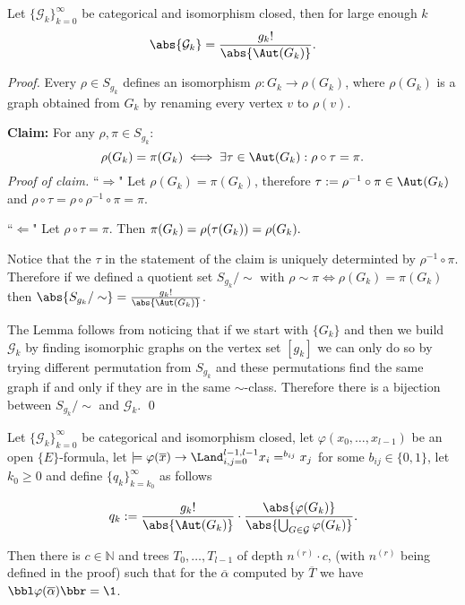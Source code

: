 \begin{lemm}
Let $\{\mathcal{G}_k\}_{k=0}^\infty$ be categorical and isomorphism closed, then for large enough $k$
\[\abs{\mathcal{G}_k}=\frac{g_k!}{\abs{\Aut(G_k)}}.\]
\end{lemm}
\begin{proof}
Every $\rho\in S_{g_k}$ defines an isomorphism $\rho:G_k\to\rho(G_k)$, where $\rho(G_k)$ is a graph obtained from $G_k$ by renaming every vertex $v$ to $\rho(v)$.

\textbf{Claim:} For any $\rho,\pi\in S_{g_k}$:
\[\rho(G_k)=\pi(G_k)\iff\exists \tau\in\Aut(G_k):\rho\circ\tau=\pi.\]
\textit{Proof of claim.} ``$\Rightarrow$" Let $\rho(G_k)=\pi(G_k)$, therefore $\tau:=\rho^{-1}\circ\pi\in\Aut(G_k)$ and $\rho\circ\tau=\rho\circ\rho^{-1}\circ\pi=\pi.$

``$\Leftarrow$" Let $\rho\circ\tau=\pi$. Then $\pi(G_k)=\rho(\tau(G_k))=\rho(G_k). \qedhere$

Notice that the $\tau$ in the statement of the claim is uniquely determinted by $\rho^{-1}\circ\pi$. Therefore if we defined a quotient set $S_{g_k}/\sim$ with $\rho\sim\pi\iff\rho(G_k)=\pi(G_k)$ then $\abs{S_{g_k}/\sim}=\frac{g_k!}{\abs{\Aut(G_k)}}$.

The Lemma follows from noticing that if we start with $\{G_k\}$ and then we build $\mathcal{G}_k$ by finding isomorphic graphs on the vertex set $[g_k]$ we can only do so by trying different permutation from $S_{g_k}$ and these permutations find the same graph if and only if they are in the same $\sim$-class. Therefore there is a bijection between $S_{g_k}/\sim$ and $\mathcal{G}_k$. \qed
\end{proof}

\begin{lemm}
Let $\{\mathcal{G}_k\}_{k=0}^\infty$ be categorical and isomorphism closed, let $\varphi(x_0,\dots,x_{l-1})$ be an open $\{E\}$-formula, let $\models \varphi(\overline x) \to \Land_{i,j=0}^{l-1,l-1}x_i=^{b_{ij}}x_j$ for some $b_{ij}\in\{0,1\}$, let $k_0\geq0$ and define $\{q_k\}_{k=k_0}^\infty$ as follows

\[q_k:=\frac{g_k!}{\abs{\Aut(G_k)}}\cdot\frac{\abs{\varphi(G_k)}}{\abs{\bigcup_{G\in\mathcal{G}}\varphi(G_k)}}.\]

Then there is $c\in\mathbb{N}$ and trees $T_0,\dots,T_{l-1}$ of depth $n^{(r)} \cdot c$, (with $n^{(r)}$ being defined in the proof) such that for the $\overline \alpha$ computed by $\overline T$ we have $\bbl\varphi(\overline \alpha)\bbr=\1$.
\end{lemm}

